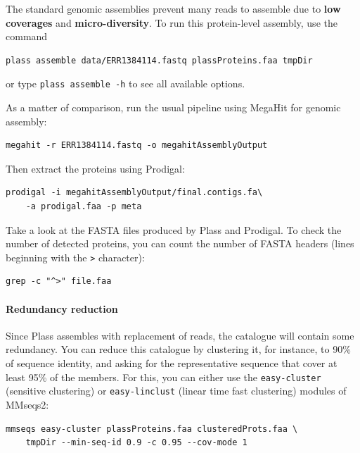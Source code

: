 \documentclass{scrartcl}
\begin{document}
The standard genomic assemblies prevent many reads to assemble due to  \textbf{low coverages} and \textbf{micro-diversity}. To run this protein-level assembly, use the command

\begin{verbatim}
plass assemble data/ERR1384114.fastq plassProteins.faa tmpDir
\end{verbatim}

or type \texttt{plass assemble -h} to see all available options.

\vspace{1em}
As a matter of comparison, run the usual pipeline using MegaHit for genomic assembly:

\begin{verbatim}
megahit -r ERR1384114.fastq -o megahitAssemblyOutput
\end{verbatim}

Then extract the proteins using Prodigal:
\begin{verbatim}
prodigal -i megahitAssemblyOutput/final.contigs.fa\
    -a prodigal.faa -p meta
\end{verbatim}

Take a look at the FASTA files produced by Plass and Prodigal. To check the number of detected proteins, you can count the number of FASTA headers (lines beginning with the \texttt{\textgreater} character):

\begin{verbatim}
grep -c "^>" file.faa
\end{verbatim}

\paragraph{Redundancy reduction}
Since Plass assembles with replacement of reads, the catalogue will contain some redundancy. You can reduce this catalogue by clustering it, for instance, to 90\% of sequence identity, and asking for the representative sequence that cover at least 95\% of the members. For this, you can either use the \texttt{easy-cluster} (sensitive clustering) or \texttt{easy-linclust} (linear time fast clustering) modules of MMseqs2:
\begin{verbatim}
mmseqs easy-cluster plassProteins.faa clusteredProts.faa \
    tmpDir --min-seq-id 0.9 -c 0.95 --cov-mode 1
\end{verbatim}
\end{document}
